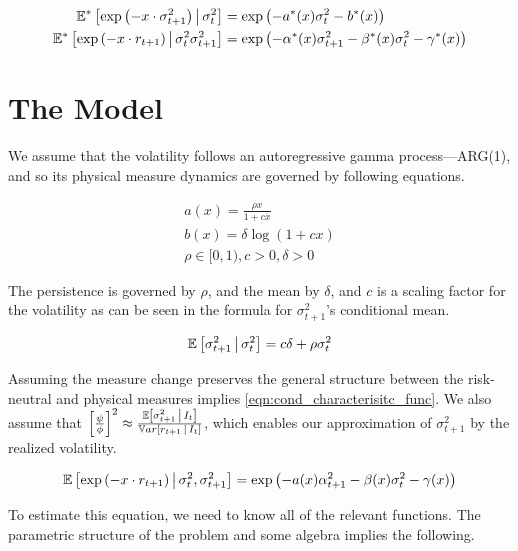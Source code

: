 \documentclass[11pt]{article}
\newcommand*{\E}{\mathbb{E}}
\newcommand*{\Var}{\mathbb{V}ar}
\newcommand{\mvert}[1][\middle]{\ensuremath{\,#1\vert\,}}
\begin{document}
\begin{align}
    \E^{*}\left[\exp\left(-x \cdot \sigma^2_{t+1}\right) \mvert \sigma^2_t\right] &= \exp\left(-a^{*}(x)
    \sigma_t^2 - b^{*}(x)\right) \\
    \E^{*}\left[\exp\left(-x \cdot r_{t+1} \right)\mvert \sigma^2_t \sigma^2_{t+1}\right] &=
    \exp\left(-\alpha^{*}(x) \sigma^2_{t+1} - \beta^{*}(x) \sigma^2_t - \gamma^{*}(x)\right)
\end{align}


\section{The Model}


We assume that the volatility follows an autoregressive gamma process---ARG(1), and so its physical measure
dynamics are governed by following equations.

\begin{gather}
    a(x) = \frac{\rho x}{1 + c x}  \\
    b(x) = \delta \log \left(1 + c x\right) \\
    \rho \in [0, 1), c > 0, \delta > 0 
\end{gather}

The persistence is governed by $\rho$, and the mean by $\delta$, and $c$ is a scaling factor for the volatility as
can be seen in the formula for $\sigma^2_{t+1}$'s conditional mean.

\begin{equation}
    \E\left[\sigma^2_{t+1} \mvert \sigma^2_t\right] = c \delta + \rho \sigma^2_t
\end{equation}

Assuming the measure change preserves the general structure between the risk-neutral and physical measures implies
\cref{eqn:cond_characterisitc_func}.
We also assume that $\left[ \frac{\psi}{\phi} \right]^2 \approx \frac{\E \left[\sigma^2_{t+1} \mvert
I_t\right]}{\Var\left[r_{t+1} \mvert I_t\right]}$, which enables our approximation of $\sigma^2_{t+1}$ by the
realized volatility.

\begin{equation}
    \label{eqn:cond_characterisitc_func}
    \E\left[\exp\left(- x \cdot r_{t+1}\right) \mvert \sigma_t^2, \sigma^2_{t+1}\right] = \exp\left(- a(x)
    \alpha^2_{t+1} - \beta(x) \sigma^2_t - \gamma(x) \right) 
\end{equation}

To estimate this equation, we need to know all of the relevant functions.
The parametric structure of the problem and some algebra implies the following.
\end{document}
